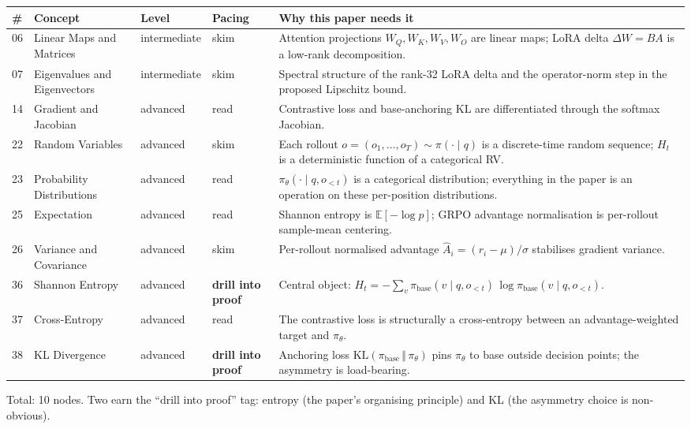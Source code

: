 \documentclass[11pt]{article}
\begin{document}
\begin{longtable}{@{}p{0.3cm}p{3.5cm}p{1.6cm}p{1.5cm}p{6.5cm}@{}}
\toprule
\# & Concept & Level & Pacing & Why this paper needs it \\
\midrule
\endhead
06 & Linear Maps and Matrices & intermediate & skim & Attention projections $W_Q, W_K, W_V, W_O$ are linear maps; LoRA delta $\Delta W = BA$ is a low-rank decomposition. \\
07 & Eigenvalues and Eigenvectors & intermediate & skim & Spectral structure of the rank-32 LoRA delta and the operator-norm step in the proposed Lipschitz bound. \\
14 & Gradient and Jacobian & advanced & read & Contrastive loss and base-anchoring KL are differentiated through the softmax Jacobian. \\
22 & Random Variables & advanced & skim & Each rollout $o = (o_1, \ldots, o_T) \sim \pi(\cdot \mid q)$ is a discrete-time random sequence; $H_t$ is a deterministic function of a categorical RV. \\
23 & Probability Distributions & advanced & read & $\pi_\theta(\cdot \mid q, o_{<t})$ is a categorical distribution; everything in the paper is an operation on these per-position distributions. \\
25 & Expectation & advanced & read & Shannon entropy is $\mathbb{E}[-\log p]$; GRPO advantage normalisation is per-rollout sample-mean centering. \\
26 & Variance and Covariance & advanced & skim & Per-rollout normalised advantage $\hat A_i = (r_i - \mu)/\sigma$ stabilises gradient variance. \\
36 & Shannon Entropy & advanced & \textbf{drill into proof} & Central object: $H_t = -\sum_v \pi_{\text{base}}(v\mid q, o_{<t})\,\log \pi_{\text{base}}(v\mid q, o_{<t})$. \\
37 & Cross-Entropy & advanced & read & The contrastive loss is structurally a cross-entropy between an advantage-weighted target and $\pi_\theta$. \\
38 & KL Divergence & advanced & \textbf{drill into proof} & Anchoring loss $\mathrm{KL}(\pi_{\text{base}} \,\Vert\, \pi_\theta)$ pins $\pi_\theta$ to base outside decision points; the asymmetry is load-bearing. \\
\bottomrule
\end{longtable}

Total: 10 nodes. Two earn the ``drill into proof'' tag: entropy (the paper's organising principle) and KL (the asymmetry choice is non-obvious).
\end{document}
